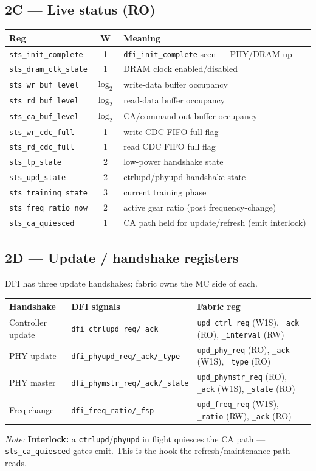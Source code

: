 \documentclass[11pt]{article}
\newcommand{\sig}[1]{\texttt{#1}}
\newcommand{\reg}[1]{\texttt{#1}}
\newcommand{\note}[1]{\par\smallskip\noindent\textit{Note:} #1\par}
\begin{document}
\subsection{2C --- Live status (RO)}
\begin{center}\begin{tabular}{@{}lcL{8.2cm}@{}}\toprule
Reg & W & Meaning \\ \midrule
\reg{sts\_init\_complete} & 1 & \sig{dfi\_init\_complete} seen --- PHY/DRAM up \\
\reg{sts\_dram\_clk\_state} & 1 & DRAM clock enabled/disabled \\
\reg{sts\_wr\_buf\_level} & $\log_2$ & write-data buffer occupancy \\
\reg{sts\_rd\_buf\_level} & $\log_2$ & read-data buffer occupancy \\
\reg{sts\_ca\_buf\_level} & $\log_2$ & CA/command out buffer occupancy \\
\reg{sts\_wr\_cdc\_full} & 1 & write CDC FIFO full flag \\
\reg{sts\_rd\_cdc\_full} & 1 & read CDC FIFO full flag \\
\reg{sts\_lp\_state} & 2 & low-power handshake state \\
\reg{sts\_upd\_state} & 2 & ctrlupd/phyupd handshake state \\
\reg{sts\_training\_state} & 3 & current training phase \\
\reg{sts\_freq\_ratio\_now} & 2 & active gear ratio (post frequency-change) \\
\reg{sts\_ca\_quiesced} & 1 & CA path held for update/refresh (emit interlock) \\ \bottomrule
\end{tabular}\end{center}

\subsection{2D --- Update / handshake registers}
DFI has three update handshakes; fabric owns the MC side of each.
\begin{center}\begin{tabular}{@{}lL{5.2cm}L{5.2cm}@{}}\toprule
Handshake & DFI signals & Fabric reg \\ \midrule
Controller update & \sig{dfi\_ctrlupd\_req/\_ack} & \reg{upd\_ctrl\_req} (W1S), \reg{\_ack} (RO), \reg{\_interval} (RW) \\
PHY update & \sig{dfi\_phyupd\_req/\_ack/\_type} & \reg{upd\_phy\_req} (RO), \reg{\_ack} (W1S), \reg{\_type} (RO) \\
PHY master & \sig{dfi\_phymstr\_req/\_ack/\_state} & \reg{upd\_phymstr\_req} (RO), \reg{\_ack} (W1S), \reg{\_state} (RO) \\
Freq change & \sig{dfi\_freq\_ratio/\_fsp} & \reg{upd\_freq\_req} (W1S), \reg{\_ratio} (RW), \reg{\_ack} (RO) \\ \bottomrule
\end{tabular}\end{center}
\note{\textbf{Interlock:} a \sig{ctrlupd}/\sig{phyupd} in flight quiesces the CA path ---
\reg{sts\_ca\_quiesced} gates emit. This is the hook the refresh/maintenance path reads.}
\end{document}
